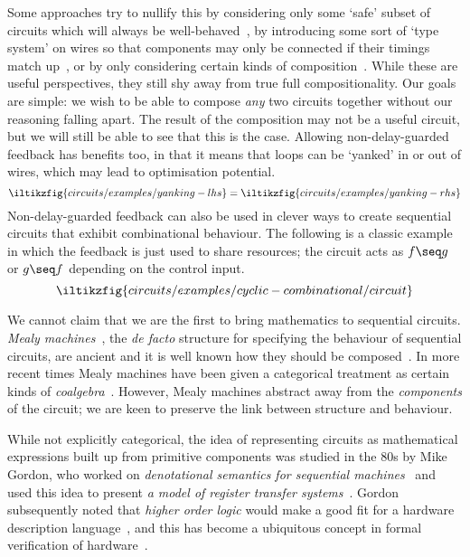 Some approaches try to nullify this by considering only some `safe' subset of
circuits which will always be well-behaved~\cite{christensen2021wire}, by
introducing some sort of `type system' on wires so that components may only be
connected if their timings match up~\cite{nigam2023modular}, or by only
considering certain kinds of composition~\cite{alekseyev2014compositional}.
While these are useful perspectives, they still shy away from true full
compositionality.
Our goals are simple: we wish to be able to compose \emph{any} two circuits
together without our reasoning falling apart.
The result of the composition may not be a useful circuit, but we will still
be able to see that this is the case.
Allowing non-delay-guarded feedback has benefits too, in that it means that
loops can be `yanked' in or out of wires, which may lead to optimisation
potential.
\[
    \iltikzfig{circuits/examples/yanking-lhs}
    =
    \iltikzfig{circuits/examples/yanking-rhs}
\]
Non-delay-guarded feedback can also be used in clever ways to create sequential
circuits that exhibit combinational behaviour.
The following is a classic example~\cite{malik1994analysis} in which the
feedback is just used to share resources; the circuit acts as \(f \seq g\) or
\(g \seq f\) depending on the control input.
\[
    \iltikzfig{circuits/examples/cyclic-combinational/circuit}
\]

We cannot claim that we are the first to bring mathematics to sequential
circuits.
\emph{Mealy machines}~\cite{mealy1955method}, the \emph{de facto} structure for
specifying the behaviour of sequential circuits, are ancient and it is well
known how they should be composed~\cite{ginzburg2014algebraic}.
In more recent times Mealy machines have been given a categorical treatment as
certain kinds of \emph{coalgebra}~\cite{rutten2006algebraic,bonsangue2008coalgebraic}.
However, Mealy machines abstract away from the \emph{components} of the circuit;
we are keen to preserve the link between structure and behaviour.

While not explicitly categorical, the idea of representing circuits as
mathematical expressions built up from primitive components was studied in the
80s by Mike Gordon, who worked on
\emph{denotational semantics for sequential machines}~\cite{gordon1980denotational}
and used this idea to present
\emph{a model of register transfer systems}~\cite{gordon1982model}.
Gordon subsequently noted that \emph{higher order logic} would make a good fit
for a hardware description language~\cite{gordon1985why}, and this has become
a ubiquitous concept in formal verification of hardware~\cite{gupta1992formal}.

